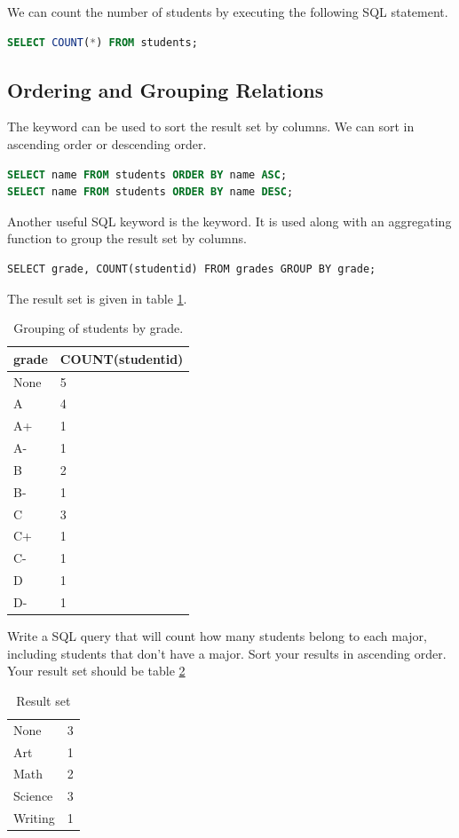 We can count the number of students by executing the following SQL statement.
\begin{lstlisting}[language=SQL]
SELECT COUNT(*) FROM students;
\end{lstlisting}

\subsection*{Ordering and Grouping Relations}
The  keyword can be used to sort the result set by columns.
We can sort in ascending order or descending order.
\begin{lstlisting}[language=SQL]
SELECT name FROM students ORDER BY name ASC;
SELECT name FROM students ORDER BY name DESC;
\end{lstlisting}

Another useful SQL keyword is the  keyword.
It is used along with an aggregating function to group the result set by columns.
\begin{lstlisting}
SELECT grade, COUNT(studentid) FROM grades GROUP BY grade;
\end{lstlisting}
The result set is given in table \ref{table:group_by_grade}.
\begin{table}
\begin{tabular}{|l|l|}
\hline
grade & COUNT(studentid) \\
\hline
None & 5 \\
A & 4 \\
A+ & 1 \\
A- & 1 \\
B & 2 \\
B- & 1 \\
C & 3 \\
C+ & 1 \\
C- & 1 \\
D & 1 \\
D- & 1 \\
\hline
\end{tabular}
\caption{Grouping of students by grade.}
\label{table:group_by_grade}
\end{table}

\begin{problem}
Write a SQL query that will count how many students belong to each major, including students that don't have a major.  Sort your results in ascending order.
Your result set should be table \ref{table:grouporder}
\begin{table}[H]
\begin{tabular}{|l|l|}
\hline
None & 3 \\
Art & 1 \\
Math & 2 \\
Science & 3 \\
Writing & 1 \\
\hline
\end{tabular}
\caption{Result set}
\label{table:grouporder}
\end{table}
\label{prob:studentmajors}
\end{problem}

